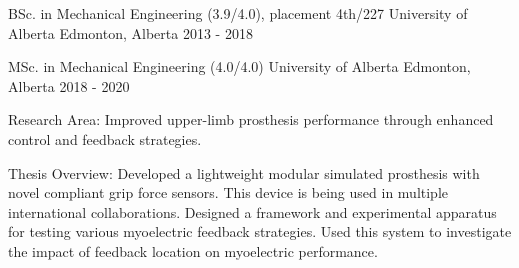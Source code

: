 

\begin{cventries}

  \cventry
    {BSc. in Mechanical Engineering (3.9/4.0), placement 4th/227} %
    {University of Alberta} %
    {Edmonton, Alberta} %
    {2013 - 2018} %
    { }

  \cventry
    {MSc. in Mechanical Engineering (4.0/4.0)} %
    {University of Alberta} %
    {Edmonton, Alberta} %
    {2018 - 2020} %
    {
      \begin{cvitems} %
        \item {Research Area: Improved upper-limb prosthesis performance through
        enhanced control and feedback strategies.}
        \item {Thesis Overview:
        Developed a lightweight modular simulated prosthesis
        with novel compliant grip force sensors. This device is
        being used in multiple international collaborations. Designed a framework and experimental apparatus for
        testing various myoelectric feedback strategies.  Used
        this system to investigate the impact of feedback location
        on myoelectric performance.}
      \end{cvitems}
    }

\end{cventries}
